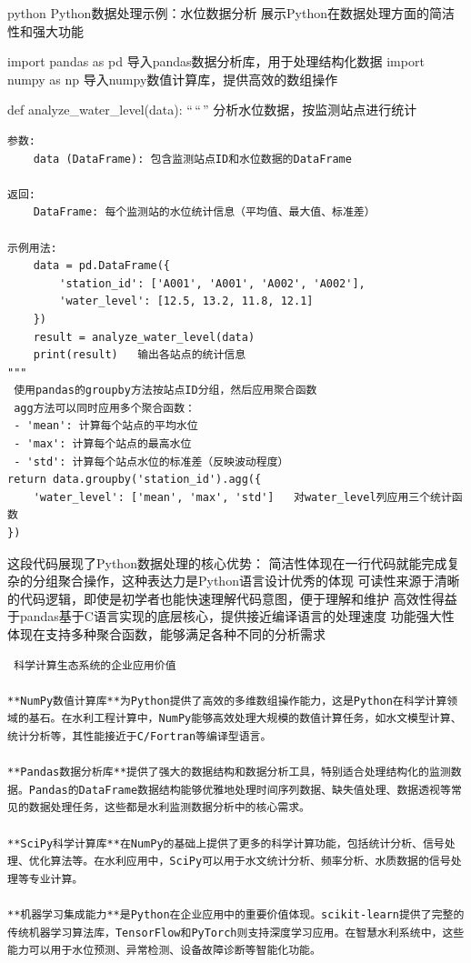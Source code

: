 python  Python数据处理示例：水位数据分析  展示Python在数据处理方面的简洁性和强大功能

import pandas as pd  导入pandas数据分析库，用于处理结构化数据 import numpy as np  导入numpy数值计算库，提供高效的数组操作

def analyze\_water\_level(data): ``\,``\,'' 分析水位数据，按监测站点进行统计

\begin{verbatim}
参数:
    data (DataFrame): 包含监测站点ID和水位数据的DataFrame
    
返回:
    DataFrame: 每个监测站的水位统计信息（平均值、最大值、标准差）
    
示例用法:
    data = pd.DataFrame({
        'station_id': ['A001', 'A001', 'A002', 'A002'],
        'water_level': [12.5, 13.2, 11.8, 12.1]
    })
    result = analyze_water_level(data)
    print(result)   输出各站点的统计信息
"""
 使用pandas的groupby方法按站点ID分组，然后应用聚合函数
 agg方法可以同时应用多个聚合函数：
 - 'mean': 计算每个站点的平均水位
 - 'max': 计算每个站点的最高水位  
 - 'std': 计算每个站点水位的标准差（反映波动程度）
return data.groupby('station_id').agg({
    'water_level': ['mean', 'max', 'std']   对water_level列应用三个统计函数
})
\end{verbatim}

 这段代码展现了Python数据处理的核心优势：  简洁性体现在一行代码就能完成复杂的分组聚合操作，这种表达力是Python语言设计优秀的体现  可读性来源于清晰的代码逻辑，即使是初学者也能快速理解代码意图，便于理解和维护  高效性得益于pandas基于C语言实现的底层核心，提供接近编译语言的处理速度  功能强大性体现在支持多种聚合函数，能够满足各种不同的分析需求

\begin{lstlisting}
 科学计算生态系统的企业应用价值

**NumPy数值计算库**为Python提供了高效的多维数组操作能力，这是Python在科学计算领域的基石。在水利工程计算中，NumPy能够高效处理大规模的数值计算任务，如水文模型计算、统计分析等，其性能接近于C/Fortran等编译型语言。

**Pandas数据分析库**提供了强大的数据结构和数据分析工具，特别适合处理结构化的监测数据。Pandas的DataFrame数据结构能够优雅地处理时间序列数据、缺失值处理、数据透视等常见的数据处理任务，这些都是水利监测数据分析中的核心需求。

**SciPy科学计算库**在NumPy的基础上提供了更多的科学计算功能，包括统计分析、信号处理、优化算法等。在水利应用中，SciPy可以用于水文统计分析、频率分析、水质数据的信号处理等专业计算。

**机器学习集成能力**是Python在企业应用中的重要价值体现。scikit-learn提供了完整的传统机器学习算法库，TensorFlow和PyTorch则支持深度学习应用。在智慧水利系统中，这些能力可以用于水位预测、异常检测、设备故障诊断等智能化功能。
\end{lstlisting}

